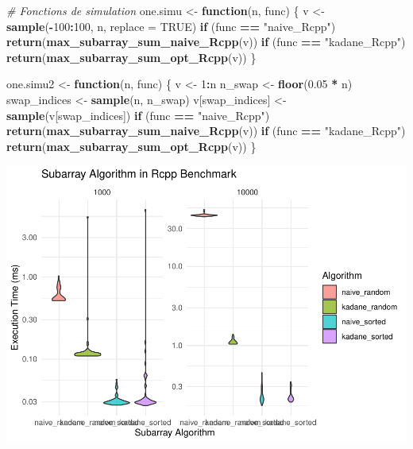\documentclass[
]{article}
\newenvironment{Shaded}{\begin{snugshade}}{\end{snugshade}}
\newcommand{\AttributeTok}[1]{\textcolor[rgb]{0.13,0.29,0.53}{#1}}
\newcommand{\CommentTok}[1]{\textcolor[rgb]{0.56,0.35,0.01}{\textit{#1}}}
\newcommand{\ConstantTok}[1]{\textcolor[rgb]{0.56,0.35,0.01}{#1}}
\newcommand{\ControlFlowTok}[1]{\textcolor[rgb]{0.13,0.29,0.53}{\textbf{#1}}}
\newcommand{\DecValTok}[1]{\textcolor[rgb]{0.00,0.00,0.81}{#1}}
\newcommand{\FloatTok}[1]{\textcolor[rgb]{0.00,0.00,0.81}{#1}}
\newcommand{\FunctionTok}[1]{\textcolor[rgb]{0.13,0.29,0.53}{\textbf{#1}}}
\newcommand{\NormalTok}[1]{#1}
\newcommand{\OtherTok}[1]{\textcolor[rgb]{0.56,0.35,0.01}{#1}}
\newcommand{\SpecialCharTok}[1]{\textcolor[rgb]{0.81,0.36,0.00}{\textbf{#1}}}
\newcommand{\StringTok}[1]{\textcolor[rgb]{0.31,0.60,0.02}{#1}}
\begin{document}
\begin{Shaded}
\begin{Highlighting}[]
\CommentTok{\# Fonctions de simulation}
\NormalTok{one.simu }\OtherTok{\textless{}{-}} \ControlFlowTok{function}\NormalTok{(n, func) \{}
\NormalTok{  v }\OtherTok{\textless{}{-}} \FunctionTok{sample}\NormalTok{(}\SpecialCharTok{{-}}\DecValTok{100}\SpecialCharTok{:}\DecValTok{100}\NormalTok{, n, }\AttributeTok{replace =} \ConstantTok{TRUE}\NormalTok{)}
  \ControlFlowTok{if}\NormalTok{ (func }\SpecialCharTok{==} \StringTok{"naive\_Rcpp"}\NormalTok{) }\FunctionTok{return}\NormalTok{(}\FunctionTok{max\_subarray\_sum\_naive\_Rcpp}\NormalTok{(v))}
  \ControlFlowTok{if}\NormalTok{ (func }\SpecialCharTok{==} \StringTok{"kadane\_Rcpp"}\NormalTok{) }\FunctionTok{return}\NormalTok{(}\FunctionTok{max\_subarray\_sum\_opt\_Rcpp}\NormalTok{(v))}
\NormalTok{\}}

\NormalTok{one.simu2 }\OtherTok{\textless{}{-}} \ControlFlowTok{function}\NormalTok{(n, func) \{}
\NormalTok{  v }\OtherTok{\textless{}{-}} \DecValTok{1}\SpecialCharTok{:}\NormalTok{n}
\NormalTok{  n\_swap }\OtherTok{\textless{}{-}} \FunctionTok{floor}\NormalTok{(}\FloatTok{0.05} \SpecialCharTok{*}\NormalTok{ n)}
\NormalTok{  swap\_indices }\OtherTok{\textless{}{-}} \FunctionTok{sample}\NormalTok{(n, n\_swap)}
\NormalTok{  v[swap\_indices] }\OtherTok{\textless{}{-}} \FunctionTok{sample}\NormalTok{(v[swap\_indices])}
  \ControlFlowTok{if}\NormalTok{ (func }\SpecialCharTok{==} \StringTok{"naive\_Rcpp"}\NormalTok{) }\FunctionTok{return}\NormalTok{(}\FunctionTok{max\_subarray\_sum\_naive\_Rcpp}\NormalTok{(v))}
  \ControlFlowTok{if}\NormalTok{ (func }\SpecialCharTok{==} \StringTok{"kadane\_Rcpp"}\NormalTok{) }\FunctionTok{return}\NormalTok{(}\FunctionTok{max\_subarray\_sum\_opt\_Rcpp}\NormalTok{(v))}
\NormalTok{\}}
\end{Highlighting}
\end{Shaded}

\includegraphics{MaxSubarray1D_files/figure-latex/benchmark2-1.pdf}
\end{document}
